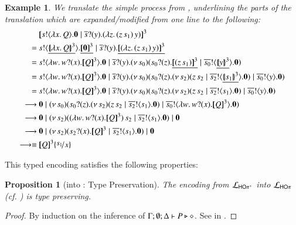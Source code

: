 \documentclass[preprint,11pt]{elsarticle}
\newtheorem{proposition}{Proposition}[section]
\newtheorem{example}{Example}[section]
\begin{document}
{\begin{example}
We translate the simple process from , underlining the parts of the translation which are expanded/modified from one line to the following:
\begin{align*}
& \map{\bout{s}{\abs{x}{Q}}\inact  \Par \binp{\dual{s}}{y}(\appl{\abs{z}{(\appl{z}{s_1}})}{y})}^{3} 
\\
=~ &
\bout{s}{\underline{\auxmap{\abs{x}{Q}}{3}}}\underline{\map{\inact}^{3}}  \Par \binp{\dual{s}}{y}\underline{\map{(\appl{\abs{z}{(\appl{z}{s_1}})}{y})}^{3}} 
\\
=~ & \bout{s}{\abs{w}{\binp{w}{x} \pmap{Q}{3}}} \inact   \Par \binp{\dual{s}}{y}\newsp{s_0}{\binp{s_0}{z} \underline{\pmap{(\appl{z}{s_1})}{3}} \Par  \bout{\dual{s_0}}{\underline{\auxmap{y}{3}}} \inact}
\\
=~ & \bout{s}{\abs{w}{\binp{w}{x} \pmap{Q}{3}}}\inact  \Par \binp{\dual{s}}{y}\newsp{s_0}{\binp{s_0}{z} \newsp{s_2}{\appl{z}{s_2} \Par \bout{\dual{s_2}}{\underline{\auxmap{s_1}{3}}} \inact} \Par  \bout{\dual{s_0}}{y} \inact}
\\
=~ & \bout{s}{\abs{w}{\binp{w}{x} \pmap{Q}{3}}}\inact  \Par \binp{\dual{s}}{y}\newsp{s_0}{\binp{s_0}{z} \newsp{s_2}{\appl{z}{s_2} \Par \bout{\dual{s_2}}{s_1} \inact} \Par  \bout{\dual{s_0}}{y} \inact}
\\
\red~ & \inact  \Par \newsp{s_0}{\binp{s_0}{z} \newsp{s_2}{\appl{z}{s_2} \Par \bout{\dual{s_2}}{s_1} \inact} \Par  \bout{\dual{s_0}}{\abs{w}{\binp{w}{x} \pmap{Q}{3}}} \inact}
\\
\red~ & \inact  \Par \newsp{s_2}{\appl{(\abs{w}{\binp{w}{x} \pmap{Q}{3}})}{s_2} \Par \bout{\dual{s_2}}{s_1} \inact} \Par \inact
\\
\red~ & \inact  \Par \newsp{s_2}{\binp{s_2}{x} \pmap{Q}{3} \Par \bout{\dual{s_2}}{s_1} \inact} \Par \inact
\\ 
\red\scong~ & \pmap{Q}{3}\subst{s_1}{x}
\end{align*}
\end{example}
This typed encoding satisfies the following properties:
{
\begin{proposition}[\HOpp into \HOp: Type Preservation]
\label{prop:typepres_HOpp_to_HOp}
The encoding from $\mathcal{L}_{\mathsf{HO\pi^{+}}}$ into $\mathcal{L}_{\mathsf{HO}\pi}$ (cf. )
is type preserving.
\end{proposition}}

\begin{proof}
	By induction on the inference of 
	$\Gamma; \emptyset; \Delta \vdash P \triangleright \diamond$.
	See  in .
	\end{proof}
	
}
\end{document}

